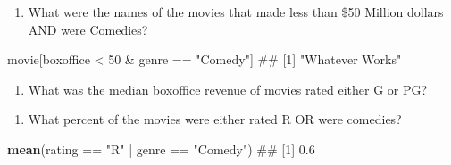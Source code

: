 \documentclass[]{book}
\newenvironment{Shaded}{\begin{snugshade}}{\end{snugshade}}
\newcommand{\KeywordTok}[1]{\textcolor[rgb]{0.13,0.29,0.53}{\textbf{{#1}}}}
\newcommand{\DecValTok}[1]{\textcolor[rgb]{0.00,0.00,0.81}{{#1}}}
\newcommand{\StringTok}[1]{\textcolor[rgb]{0.31,0.60,0.02}{{#1}}}
\newcommand{\CommentTok}[1]{\textcolor[rgb]{0.56,0.35,0.01}{\textit{{#1}}}}
\newcommand{\NormalTok}[1]{{#1}}
\providecommand{\tightlist}{%
  \setlength{\itemsep}{0pt}\setlength{\parskip}{0pt}}
\theoremstyle{definition}
\theoremstyle{definition}
\theoremstyle{remark}
\begin{document}
\begin{enumerate}
\def\labelenumi{\arabic{enumi}.}
\setcounter{enumi}{7}
\tightlist
\item
  What were the names of the movies that made less than \$50 Million
  dollars AND were Comedies?
\end{enumerate}

\begin{Shaded}
\begin{Highlighting}[]
\NormalTok{movie[boxoffice <}\StringTok{ }\DecValTok{50} \NormalTok{&}\StringTok{ }\NormalTok{genre ==}\StringTok{ "Comedy"}\NormalTok{]}
\NormalTok{## [1] "Whatever Works"}
\end{Highlighting}
\end{Shaded}

\begin{enumerate}
\def\labelenumi{\arabic{enumi}.}
\setcounter{enumi}{8}
\tightlist
\item
  What was the median boxoffice revenue of movies rated either G or PG?
\end{enumerate}

\begin{Shaded}
\end{Shaded}

\begin{enumerate}
\def\labelenumi{\arabic{enumi}.}
\setcounter{enumi}{9}
\tightlist
\item
  What percent of the movies were either rated R OR were comedies?
\end{enumerate}

\begin{Shaded}
\begin{Highlighting}[]
\KeywordTok{mean}\NormalTok{(rating ==}\StringTok{ "R"} \NormalTok{|}\StringTok{ }\NormalTok{genre ==}\StringTok{ "Comedy"}\NormalTok{)}
\NormalTok{## [1] 0.6}
\end{Highlighting}
\end{Shaded}
\end{document}

